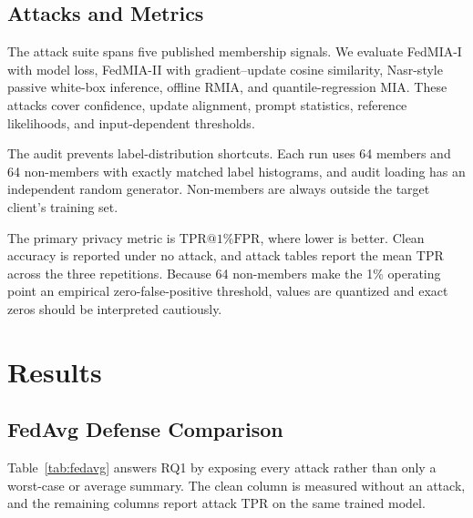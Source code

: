 \documentclass[letterpaper]{article}
\makeatletter
\newcommand{\tpr}{\ensuremath{\mathrm{TPR}@1\%\mathrm{FPR}}}
\makeatother
\begin{document}
\subsection{Attacks and Metrics}

The attack suite spans five published membership signals.  We evaluate FedMIA-I
with model loss, FedMIA-II with gradient--update cosine similarity, Nasr-style
passive white-box inference, offline RMIA, and quantile-regression MIA.  These
attacks cover confidence, update alignment, prompt statistics, reference
likelihoods, and input-dependent thresholds.

The audit prevents label-distribution shortcuts.  Each run uses 64 members and
64 non-members with exactly matched label histograms, and audit loading has an
independent random generator.  Non-members are always outside the target
client's training set.

The primary privacy metric is \tpr{}, where lower is better.  Clean accuracy is
reported under no attack, and attack tables report the mean TPR across the three
repetitions.  Because 64 non-members make the 1\% operating point an empirical
zero-false-positive threshold, values are quantized and exact zeros should be
interpreted cautiously.

\section{Results}

\subsection{FedAvg Defense Comparison}

Table~\ref{tab:fedavg} answers RQ1 by exposing every attack rather than only a
worst-case or average summary.  The clean column is measured without an attack,
and the remaining columns report attack TPR on the same trained model.
\end{document}
